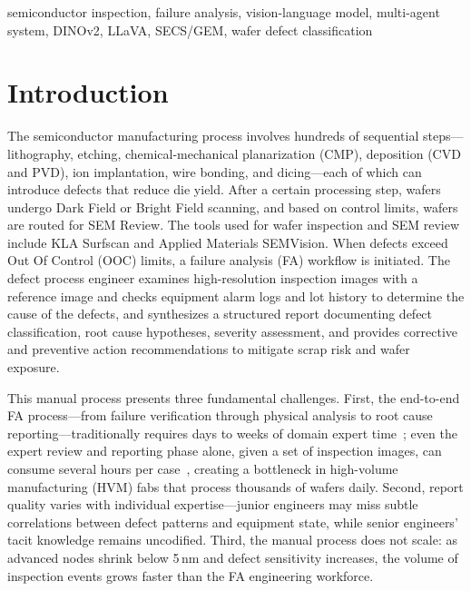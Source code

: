 \documentclass[conference]{IEEEtran}
\begin{document}
\begin{IEEEkeywords}
semiconductor inspection, failure analysis, vision-language model, multi-agent system, DINOv2, LLaVA, SECS/GEM, wafer defect classification
\end{IEEEkeywords}

\section{Introduction}
\label{sec:introduction}

The semiconductor manufacturing process involves hundreds of sequential steps---lithography, etching, chemical-mechanical planarization (CMP), deposition (CVD and PVD), ion implantation, wire bonding, and dicing---each of which can introduce defects that reduce die yield.
After a certain processing step, wafers undergo Dark Field or Bright Field scanning, and based on control limits, wafers are routed for SEM Review.
The tools used for wafer inspection and SEM review include KLA Surfscan and Applied Materials SEMVision.
When defects exceed Out Of Control (OOC) limits, a failure analysis (FA) workflow is initiated.
The defect process engineer examines high-resolution inspection images with a reference image and checks equipment alarm logs and lot history to determine the cause of the defects, and synthesizes a structured report documenting defect classification, root cause hypotheses, severity assessment, and provides corrective and preventive action recommendations to mitigate scrap risk and wafer exposure.

This manual process presents three fundamental challenges.
First, the end-to-end FA process---from failure verification through physical analysis to root cause reporting---traditionally requires days to weeks of domain expert time~\cite{infinitalab2023fa,azom2023fab}; even the expert review and reporting phase alone, given a set of inspection images, can consume several hours per case~\cite{kla2023klarity,amat2023actionable}, creating a bottleneck in high-volume manufacturing (HVM) fabs that process thousands of wafers daily.
Second, report quality varies with individual expertise---junior engineers may miss subtle correlations between defect patterns and equipment state, while senior engineers' tacit knowledge remains uncodified.
Third, the manual process does not scale: as advanced nodes shrink below 5\,nm and defect sensitivity increases, the volume of inspection events grows faster than the FA engineering workforce.
\end{document}
